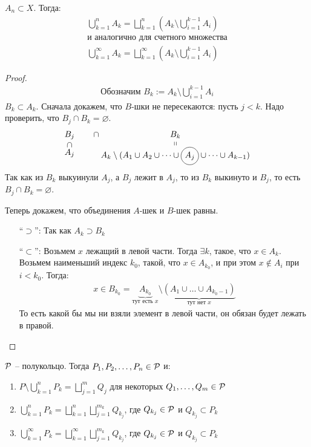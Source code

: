 \begin{lemma}
  $A_n \subset X$. Тогда:
  \begin{gather*}
    \bigcup\limits_{k=1}^n A_k = \bigsqcup\limits_{k=1}^n \left( A_k \setminus \bigcup\limits_{i=1}^{k-1} A_i \right) \\
    \text{и аналогично для счетного множества} \\
    \bigcup\limits_{k=1}^\infty A_k = \bigsqcup\limits_{k=1}^\infty \left( A_k \setminus \bigcup\limits_{i=1}^{k-1} A_i \right) 
  \end{gather*}
\end{lemma}

\begin{proof}
  \begin{gather*}
    \text{Обозначим } B_k := A_k \setminus \bigcup_{i=1}^{k-1} A_i
  \end{gather*}
  $B_k \subset A_k$. Сначала докажем, что $B$-шки не пересекаются: пусть $j < k$. Надо проверить, что 
  $B_j \cap B_k = \varnothing$. 
  \begin{gather*}
    \subsetbelow{B_j}{A_j} \qquad \cap \stackbelow{B_k}{A_k \setminus (A_1 \cup A_2 \cup \dots \cup \text{\circled{$A_j$}} \cup \dots \cup A_{k-1})}
  \end{gather*} 
  Так как из $B_k$ выкуинули $A_j$, а $B_j$ лежит в $A_j$, то из $B_k$ выкинуто и $B_j$, то есть $B_j \cap B_k = \varnothing$. 
  
  Теперь докажем, что объединения $A$-шек и $B$-шек равны. 
  \begin{enumerate}
    \item[``$\supset$'':] Так как $A_k \supset B_k$
    \item[``$\subset$'':] Возьмем $x$ лежащий в левой части. Тогда $\exists k$, такое, что 
    $x \in A_k$. Возьмем наименьший индекс $k_0$, такой, что $x \in A_{k_0}$, и при этом $x \notin A_i$ при $i < k_0$.
    Тогда:
    \begin{gather*}
      x \in B_{k_0} = \underbrace{A_{k_0}}_{\text{тут есть } x} \setminus \underbrace{(A_1 \cup \dots \cup A_{k_0 - 1})}_{\text{тут нет } x}
    \end{gather*}
    То есть какой бы мы ни взяли элемент в левой части, он обязан будет лежать в правой.
  \end{enumerate}
\end{proof}

\begin{theorem}
  $\mathcal{P}$ -- полукольцо. Тогда $P_1, P_2, \dots, P_n \in \mathcal{P}$ и:
  \begin{enumerate}
    \item $P\setminus \bigcup\limits_{k=1}^n P_k = \bigsqcup\limits_{j=1}^m Q_j$ для некоторых $Q_1, \dots, Q_m \in \mathcal{P}$
    \item $\bigcup\limits_{k=1}^n P_k = \bigsqcup\limits_{k=1}^n \bigsqcup\limits_{j=1}^{m_k} Q_{k_j}$, где $Q_{k_j} \in \mathcal{P}$ и $Q_{k_j} \subset P_k$
    \item $\bigcup\limits_{k=1}^\infty P_k = \bigsqcup\limits_{k=1}^\infty \bigsqcup\limits_{j=1}^{m_k} Q_{k_j}$, где $Q_{k_j} \in \mathcal{P}$ и $Q_{k_j} \subset P_k$
  \end{enumerate}
\end{theorem}

